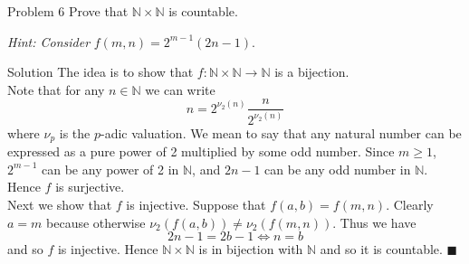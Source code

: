 \documentclass{article}
\begin{document}
\begin{problem}{Problem 6}
Prove that $\mathbb{N} \times \mathbb{N}$ is countable.

\textit{Hint: Consider } $f(m,n) = 2^{m-1}(2n-1)$.
\end{problem}

\begin{solution}{Solution}
The idea is to show that
$f : \mathbb{N} \times \mathbb{N} \rightarrow \mathbb{N}$ is a bijection.
\\

Note that for any $n \in \mathbb{N}$ we can write
$$
n = 2^{\nu_2(n)} \frac{n}{2^{\nu_2(n)}}
$$
where $\nu_p$ is the $p$-adic valuation. We mean to say that any natural
number can be expressed as a pure power of 2 multiplied by some odd number.
Since $m \geq 1$, $2^{m-1}$ can be any power of 2 in $\mathbb{N}$,
and $2n-1$ can be any odd number in $\mathbb{N}$. Hence $f$ is surjective.
\\

Next we show that $f$ is injective. Suppose that $f(a,b) = f(m,n)$.
Clearly $a = m$ because otherwise $\nu_2(f(a,b)) \neq \nu_2(f(m,n))$.
Thus we have
$$
2n-1 = 2b-1 \iff n=b
$$
and so $f$ is injective. Hence $\mathbb{N} \times \mathbb{N}$ is in
bijection with $\mathbb{N}$ and so it is countable. $\blacksquare$
\end{solution}
\end{document}
